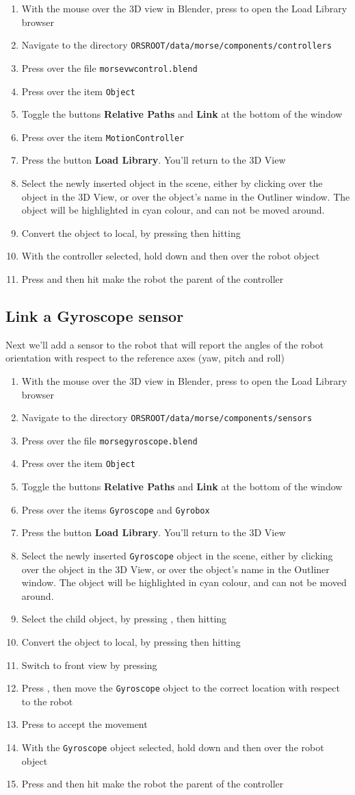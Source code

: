 \documentclass[twoside,a4paper,10pt]{report}
\newcommand{\dokutitleleveltree}[1]{\subsection{#1}}
\newcommand{\dokubold}[1]{\textbf{#1}}
\newcommand{\dokumonospace}[1]{\texttt{#1}}
\newcommand{\dokuitem}{\item}
\begin{document}
\begin{enumerate}\dokuitem  With the mouse over the 3D view in Blender, press  to open the Load Library browser
\dokuitem  Navigate to the directory \dokumonospace{{\textdollar}ORS{\textunderscore}ROOT/data/morse/components/controllers}
\dokuitem  Press  over the file \dokumonospace{morse{\textunderscore}vw{\textunderscore}control.blend}
\dokuitem  Press  over the item \dokumonospace{Object}
\dokuitem  Toggle the buttons \dokubold{Relative Paths} and \dokubold{Link} at the bottom of the window
\dokuitem  Press  over the item \dokumonospace{Motion{\textunderscore}Controller}
\dokuitem  Press the button \dokubold{Load Library}. You'll return to the 3D View
\dokuitem  Select the newly inserted object in the scene, either by  clicking over the object in the 3D View, or  over the object's name in the Outliner window. The object will be highlighted in cyan colour, and can not be moved around.
\dokuitem  Convert the object to local, by pressing  then hitting 
\dokuitem  With the controller selected, hold down  and then  over the robot object
\dokuitem  Press  and then hit  make the robot the parent of the controller
\end{enumerate}

\dokutitleleveltree{Link a Gyroscope sensor}
\label{f019fe80659ff060e77872347a3add5c}%

Next we'll add a sensor to the robot that will report the angles of the robot orientation with respect to the reference axes (yaw, pitch and roll)



\begin{enumerate}\dokuitem  With the mouse over the 3D view in Blender, press  to open the Load Library browser
\dokuitem  Navigate to the directory \dokumonospace{{\textdollar}ORS{\textunderscore}ROOT/data/morse/components/sensors}
\dokuitem  Press  over the file \dokumonospace{morse{\textunderscore}gyroscope.blend}
\dokuitem  Press  over the item \dokumonospace{Object}
\dokuitem  Toggle the buttons \dokubold{Relative Paths} and \dokubold{Link} at the bottom of the window
\dokuitem  Press  over the items \dokumonospace{Gyroscope} and \dokumonospace{Gyro{\textunderscore}box}
\dokuitem  Press the button \dokubold{Load Library}. You'll return to the 3D View
\dokuitem  Select the newly inserted \dokumonospace{Gyroscope} object in the scene, either by  clicking over the object in the 3D View, or  over the object's name in the Outliner window. The object will be highlighted in cyan colour, and can not be moved around.
\dokuitem  Select the child object, by pressing , then hitting 
\dokuitem  Convert the object to local, by pressing  then hitting 
\dokuitem  Switch to front view by pressing 
\dokuitem  Press , then move the \dokumonospace{Gyroscope} object to the correct location with respect to the robot
\dokuitem  Press  to accept the movement
\dokuitem  With the \dokumonospace{Gyroscope} object selected, hold down  and then  over the robot object
\dokuitem  Press  and then hit  make the robot the parent of the controller
\end{enumerate}
\end{document}
